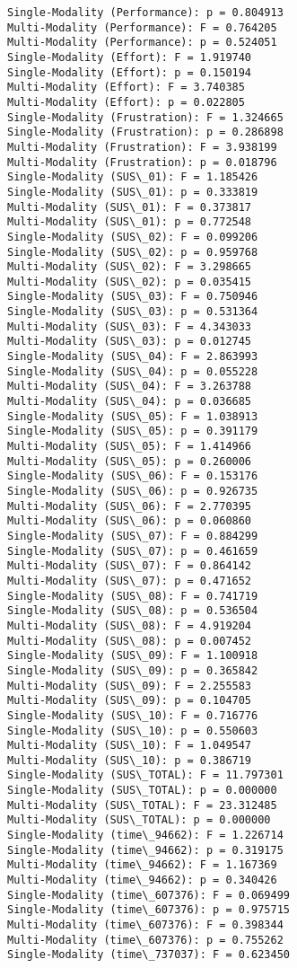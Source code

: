 \documentclass[11pt]{article}
\begin{document}
\begin{Verbatim}[commandchars=\\\{\}]
Single-Modality (Performance): p = 0.804913
Multi-Modality (Performance): F = 0.764205
Multi-Modality (Performance): p = 0.524051
Single-Modality (Effort): F = 1.919740
Single-Modality (Effort): p = 0.150194
Multi-Modality (Effort): F = 3.740385
Multi-Modality (Effort): p = 0.022805
Single-Modality (Frustration): F = 1.324665
Single-Modality (Frustration): p = 0.286898
Multi-Modality (Frustration): F = 3.938199
Multi-Modality (Frustration): p = 0.018796
Single-Modality (SUS\_01): F = 1.185426
Single-Modality (SUS\_01): p = 0.333819
Multi-Modality (SUS\_01): F = 0.373817
Multi-Modality (SUS\_01): p = 0.772548
Single-Modality (SUS\_02): F = 0.099206
Single-Modality (SUS\_02): p = 0.959768
Multi-Modality (SUS\_02): F = 3.298665
Multi-Modality (SUS\_02): p = 0.035415
Single-Modality (SUS\_03): F = 0.750946
Single-Modality (SUS\_03): p = 0.531364
Multi-Modality (SUS\_03): F = 4.343033
Multi-Modality (SUS\_03): p = 0.012745
Single-Modality (SUS\_04): F = 2.863993
Single-Modality (SUS\_04): p = 0.055228
Multi-Modality (SUS\_04): F = 3.263788
Multi-Modality (SUS\_04): p = 0.036685
Single-Modality (SUS\_05): F = 1.038913
Single-Modality (SUS\_05): p = 0.391179
Multi-Modality (SUS\_05): F = 1.414966
Multi-Modality (SUS\_05): p = 0.260006
Single-Modality (SUS\_06): F = 0.153176
Single-Modality (SUS\_06): p = 0.926735
Multi-Modality (SUS\_06): F = 2.770395
Multi-Modality (SUS\_06): p = 0.060860
Single-Modality (SUS\_07): F = 0.884299
Single-Modality (SUS\_07): p = 0.461659
Multi-Modality (SUS\_07): F = 0.864142
Multi-Modality (SUS\_07): p = 0.471652
Single-Modality (SUS\_08): F = 0.741719
Single-Modality (SUS\_08): p = 0.536504
Multi-Modality (SUS\_08): F = 4.919204
Multi-Modality (SUS\_08): p = 0.007452
Single-Modality (SUS\_09): F = 1.100918
Single-Modality (SUS\_09): p = 0.365842
Multi-Modality (SUS\_09): F = 2.255583
Multi-Modality (SUS\_09): p = 0.104705
Single-Modality (SUS\_10): F = 0.716776
Single-Modality (SUS\_10): p = 0.550603
Multi-Modality (SUS\_10): F = 1.049547
Multi-Modality (SUS\_10): p = 0.386719
Single-Modality (SUS\_TOTAL): F = 11.797301
Single-Modality (SUS\_TOTAL): p = 0.000000
Multi-Modality (SUS\_TOTAL): F = 23.312485
Multi-Modality (SUS\_TOTAL): p = 0.000000
Single-Modality (time\_94662): F = 1.226714
Single-Modality (time\_94662): p = 0.319175
Multi-Modality (time\_94662): F = 1.167369
Multi-Modality (time\_94662): p = 0.340426
Single-Modality (time\_607376): F = 0.069499
Single-Modality (time\_607376): p = 0.975715
Multi-Modality (time\_607376): F = 0.398344
Multi-Modality (time\_607376): p = 0.755262
Single-Modality (time\_737037): F = 0.623450

\end{Verbatim}
\end{document}
